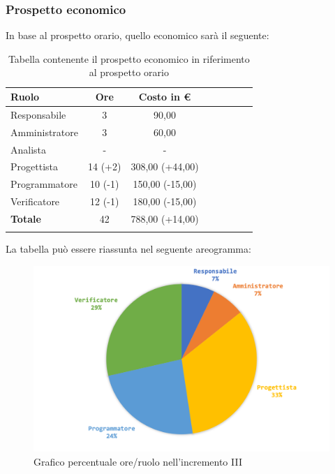 		\subsubsection{Prospetto economico}
			In base al prospetto orario, quello economico sarà il seguente: 
			
			\begin{longtable}{|l|c|c|c|c|c|c|c|}
				\hline
				\rowcolor{lighter-grayer}
				\textbf{Ruolo} & \textbf{Ore} & \textbf{Costo in €} \\
				\hline
				\endfirsthead
				\hline
			Responsabile 	    & 3 & 90,00 \\
			\hline 
			\hline
			Amministratore	  & 3 & 60,00\\
			\hline
			\hline
			Analista 				& - & -\\
			\hline
			\hline
			Progettista 		  & 14 (+2) & 308,00 (+44,00)\\
			\hline
			\hline
			Programmatore 	 & 10 (-1) & 150,00 (-15,00) \\
			\hline
			\hline
			Verificatore 		  & 12 (-1) & 180,00 (-15,00)\\
			\hline
			\textbf{Totale} 	& 42 & 788,00 (+14,00)\\
			\hline 
				
				\caption{Tabella contenente il prospetto economico in riferimento al prospetto orario}
			\end{longtable}
		\pagebreak
			
			La tabella può essere riassunta nel seguente areogramma:
			\begin{figure}[H]
				\centering
				\includegraphics[width=0.8\linewidth]{images/consuntivo/ConsIncr3-2.png}
				\caption{Grafico percentuale ore/ruolo nell'incremento III}
				\label{fig:consuntivo grafico costi ruolo incremento III}
			\end{figure}

